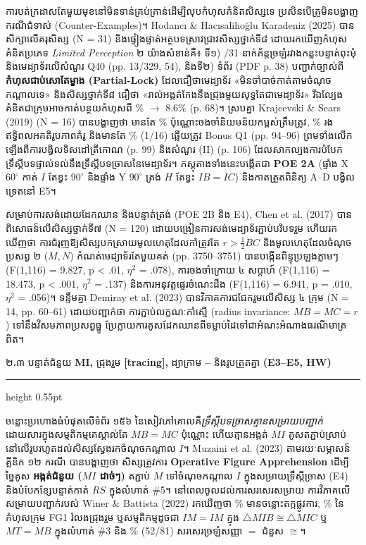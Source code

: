 \documentclass[a4paper,12pt]{article}
\newcommand{\en}[1]{{\TimesEn #1}}
\newcommand{\enbf}[1]{{\TimesEn\textbf{#1}}}
\newcommand{\cnum}[1]{{\TimesEn\fontsize{10.5pt}{12pt}\selectfont\ding{\numexpr181+#1\relax}}}
\newcommand{\tri}[1]{\ensuremath{\triangle #1}}
\newcommand{\cg}{\ensuremath{\cong}}
\newcommand{\subsectitle}[1]{{\muol\fontsize{11pt}{14.5pt}\selectfont #1}}
\newcommand{\subsec}[1]{%
  \Needspace{1.6cm}%
  \vspace{4pt}%
  \subsectitle{#1}\par%
  \vspace{-2pt}%
  {\color{black}\hrule height 0.55pt}%
  \vspace{3.5pt}%
}
\begin{document}
ការបត់ក្រដាសតែមួយមុខនៅមិនទាន់គ្រប់គ្រាន់ដើម្បីលុបកំហុសគំនិតសិស្សទេ ប្រសិនបើគ្រូមិនបង្ហាញករណីជំទាស់ (\en{Counter-Examples})។ \en{Hodancı \& Hacısalihoğlu Karadeniz (2025)} បានសិក្សាលើគរុសិស្ស (\en{N = 31}) និងផ្ទៀងផ្ទាត់អត្ថបទស្រាវជ្រាវសិស្សថ្នាក់ទី៨ ដោយរកឃើញកំហុសគំនិតប្រភេទ \emph{Limited Perception} ២ យ៉ាងសំខាន់គឺ៖ ទី១) \en{9/31} នាក់ភ័ន្តច្រឡំរវាងកន្លះបន្ទាត់ពុះមុំ និងមេដ្យាទ័រលើសំណួរ \en{Q40} (\en{pp. 13/329, 54}), និងទី២) ទំព័រ \en{66} (PDF p. 38) បញ្ជាក់ច្បាស់ពី \textbf{កំហុសជាប់សោតែម្ខាង (\en{Partial-Lock})} ដែលជឿថាមេដ្យាទ័រ «មិនចាំបាច់កាត់តាមចំណុចកណ្ដាលទេ» និងសិស្សថ្នាក់ទី៨ ជឿថា «រាល់អង្កត់កែងនឹងជ្រុងមួយសុទ្ធតែជាមេដ្យាទ័រ» រីឯល្បែងគំនិតជាក្រុមអាចកាត់បន្ថយកំហុសពី \en{14.1\% $\to$ 8.6\%} (\en{p. 68})។ ស្របគ្នា \en{Krajcevski \& Sears (2019)} (\en{N = 16}) បានបង្ហាញថា មានតែ \en{25\%} ប៉ុណ្ណោះចងចាំនិយមន័យកម្ពស់ត្រឹមត្រូវ, \en{44\%} រងឥទ្ធិពលអគតិរូបភាពគំរូ និងមានតែ \en{6\% (1/16)} ឆ្លើយត្រូវ \en{Bonus Q1} (\en{pp. 94--96}) ព្រមទាំងលើកឡើងពីការបង្វិលទិសដៅត្រីកោណ (\en{p. 99}) និងសំណួរ \en{2(II)} (\en{p. 106}) ដែលសាកល្បងការបំបែកទ្រឹស្ដីបទផ្ទាល់ទល់នឹងទ្រឹស្ដីបទច្រាសនៃមេដ្យាទ័រ។ ភស្តុតាងទាំងនេះបង្កើតជា \textbf{\en{POE 2A}} (ផ្ទាំង \en{X} $60^\circ$ កាត់ $I$ តែខ្វះ $90^\circ$ និងផ្ទាំង \en{Y} $90^\circ$ ត្រង់ $H$ តែខ្វះ $IB=IC$) និងកាតត្រួតពិនិត្យ \en{A--D} បង្វិលទ្រេតនៅ \en{E5}។

សម្រាប់ការសង់ដោយដែកឈាន និងបន្ទាត់ត្រង់ (\en{POE 2B} និង \en{E4}), \en{Chen et al. (2017)} បានពិសោធន៍លើសិស្សថ្នាក់ទី៧ (\en{N = 120}) ដោយបង្រៀនការសង់មេដ្យាទ័រភ្ជាប់បរិបទរួម ហើយរកឃើញថា ការជំរុញឱ្យសិស្សបកស្រាយមូលហេតុដែលកាំត្រូវតែ $r > \frac{1}{2}BC$ និងមូលហេតុដែលចំណុចប្រសព្វ ២ ($M, N$) កំណត់មេដ្យាទ័រតែមួយគត់ (\en{pp. 3750--3751}) បានបង្កើនពិន្ទុប្រឡងភ្លាមៗ (\en{F(1,116) = 9.827, p < .01, $\eta^2$ = .078}), ការចងចាំក្រោយ ៤ សប្ដាហ៍ (\en{F(1,116) = 18.473, p < .001, $\eta^2$ = .137}) និងការអនុវត្តផ្ទេរចំណេះដឹង (\en{F(1,116) = 6.941, p = .010, $\eta^2$ = .056})។ ទន្ទឹមគ្នា \en{Demiray et al. (2023)} បានវិភាគការជជែករួមលើសិស្ស ៤ ក្រុម (\en{N = 14}, \en{pp. 60--61}) ដោយបញ្ជាក់ថា ការភ្ជាប់លក្ខណៈកាំស្មើ (\en{radius invariance}: $MB = MC = r$) ទៅនឹងវិសមភាពប្រសព្វធ្នូ ប្រែក្លាយការគូសដែកឈានពីទម្លាប់ដៃទៅជាអំណះអំណាងធរណីមាត្រពិត។

\subsec{២\enbf{.}៣ បន្ទាត់ជំនួយ \enbf{MI,} ជ្រុងរួម \enbf{[tracing],} ដ្យាក្រាម \cnum{1}\enbf{--}\cnum{5} និងរូបត្រួតគ្នា \enbf{(E3--E5, HW)}}

ចន្លោះប្រហោងធំបំផុតលើទំព័រ ១៥៦ នៃសៀវភៅគោលគឺ\emph{ទ្រឹស្ដីបទច្រាសគ្មានសម្រាយបញ្ជាក់} ដោយសារក្នុងសម្មតិកម្មគេស្គាល់តែ $MB = MC$ ប៉ុណ្ណោះ ហើយគ្មានអង្កត់ $MI$ គូសតភ្ជាប់ស្រាប់នៅលើរូបរហូតដល់សិស្សស្វែងរកចំណុចកណ្ដាល $I$។ \en{Muzaini et al. (2023)} តាមរយៈសម្ភាសន៍គ្លីនិក ១២ ករណី បានបង្ហាញថា សិស្សត្រូវការ \textbf{\en{Operative Figure Apprehension}} ដើម្បីច្នៃគូស \textbf{អង្កត់ជំនួយ ($MI$ ដាច់ៗ)} តភ្ជាប់ $M$ ទៅចំណុចកណ្ដាល $I$ ក្នុងសម្រាយទ្រឹស្ដីច្រាស (\en{E4}) និងបំបែកខ្សែបន្ទាត់កាត់ $RS$ ក្នុងលំហាត់ \en{\#5}។ នៅពេលចូលដល់ការសរសេរសម្រាយ ការវិភាគលើ \en{84} សម្រាយបញ្ជាក់របស់ \en{Winer \& Battista (2022)} រកឃើញថា \en{72.5\%} មានចន្លោះតក្កផ្លូវការ, \en{49\%} នៃកំហុសក្រុម \en{FG1} រំលងជ្រុងរួម ឬសម្មតិកម្មដូចជា $IM = IM$ ក្នុង $\tri{MIB} \cg \tri{MIC}$ ឬ $MT=MB$ ក្នុងលំហាត់ \en{\#3} និង \en{64\% (52/81)} សរសេរច្រឡំសញ្ញា \en{$=$} ជំនួស \en{$\cg$}។
\end{document}
